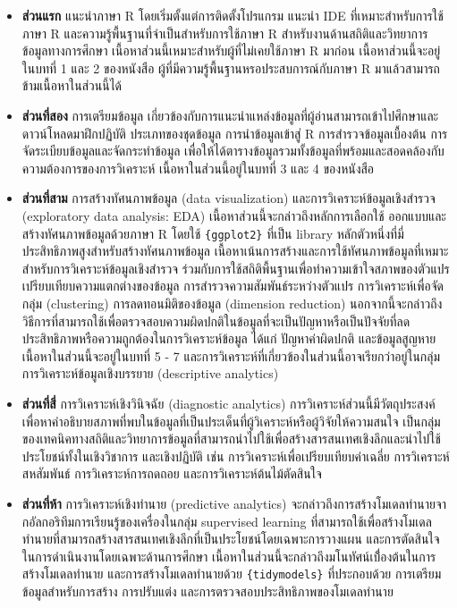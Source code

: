 \documentclass[
  a4paper,
]{book}
\begin{document}
\begin{itemize}
\item
  \textbf{ส่วนแรก} แนะนำภาษา R โดยเริ่มตั้งแต่การติดตั้งโปรแกรม แนะนำ IDE
  ที่เหมาะสำหรับการใช้ภาษา R และความรู้พื้นฐานที่จำเป็นสำหรับการใช้ภาษา R
  สำหรับงานด้านสถิติและวิทยาการข้อมูลทางการศึกษา
  เนื้อหาส่วนนี้เหมาะสำหรับผู้ที่ไม่เคยใช้ภาษา R มาก่อน เนื้อหาส่วนนี้จะอยู่ในบทที่ 1 และ 2
  ของหนังสือ ผู้ที่มีความรู้พื้นฐานหรอประสบการณ์กับภาษา R มาแล้วสามารถข้ามเนื้อหาในส่วนนี้ได้
\item
  \textbf{ส่วนที่สอง} การเตรียมข้อมูล
  เกี่ยวข้องกับการแนะนำแหล่งข้อมูลที่ผู้อ่านสามารถเข้าไปศึกษาและดาวน์โหลดมาฝึกปฏิบัติ
  ประเภทของชุดข้อมูล การนำข้อมูลเข้าสู่ R การสำรวจข้อมูลเบื้องต้น
  การจัดระเบียบข้อมูลและจัดกระทำข้อมูล
  เพื่อให้ได้ตารางข้อมูลรวมทั้งข้อมูลที่พร้อมและสอดคล้องกับความต้องการของการวิเคราะห์
  เนื้อหาในส่วนนี้อยู่ในบทที่ 3 และ 4 ของหนังสือ
\item
  \textbf{ส่วนที่สาม} การสร้างทัศนภาพข้อมูล (data visualization)
  และการวิเคราะห์ข้อมูลเชิงสำรวจ (exploratory data analysis: EDA)
  เนื้อหาส่วนนี้จะกล่าวถึงหลักการเลือกใช้ ออกแบบและสร้างทัศนภาพข้อมูลด้วยภาษา R โดยใช้
  \texttt{\{ggplot2\}} ที่เป็น library
  หลักตัวหนึ่งที่มี่ประสิทธิภาพสูงสำหรับสร้างทัศนภาพข้อมูล
  เนื้อหาเน้นการสร้างและการใช้ทัศนภาพข้อมูลที่เหมาะสำหรับการวิเคราะห์ข้อมูลเชิงสำรวจ
  ร่วมกับการใช้สถิติพื้นฐานเพื่อทำความเข้าใจสภาพของตัวแปร
  เปรียบเทียบความแตกต่างของข้อมูล การสำรวจความสัมพันธ์ระหว่างตัวแปร
  การวิเคราะห์เพื่อจัดกลุ่ม (clustering) การลดทอนมิติของข้อมูล (dimension
  reduction)
  นอกจากนี้จะกล่าวถึงวิธีการที่สามารถใช้เพื่อตรวจสอบความผิดปกติในข้อมูลที่จะเป็นปัญหาหรือเป็นปัจจัยที่ลดประสิทธิภาพหรือความถูกต้องในการวิเคราะห์ข้อมูล
  ได้แก่ ปัญหาค่าผิดปกติ และข้อมูลสูญหาย เนื้อหาในส่วนนี้จะอยู่ในบทที่ 5 - 7
  และการวิเคราะห์ที่เกี่ยวข้องในส่วนนี้อาจเรียกว่าอยู่ในกลุ่ม การวิเคราะห์ข้อมูลเชิงบรรยาย
  (descriptive analytics)
\item
  \textbf{ส่วนที่สี่} การวิเคราะห์เชิงวินิจฉัย (diagnostic analytics)
  การวิเคราะห์ส่วนนี้มีวัตถุประสงค์เพื่อหาคำอธิบายสภาพที่พบในข้อมูลที่เป็นประเด็นที่ผู้วิเคราะห์หรือผู้วิจัยให้ความสนใจ
  เป็นกลุ่มของเทคนิคทางสถิติและวิทยาการข้อมูลที่สามารถนำไปใช้เพื่อสร้างสารสนเทศเชิงลึกและนำไปใช้ประโยชน์ทั้งในเชิงวิชาการ
  และเชิงปฏิบัติ เช่น การวิเคราะห์เพื่อเปรียบเทียบค่าเฉลี่ย การวิเคราะห์สหสัมพันธ์
  การวิเคราะห์การถดถอย และการวิเคราะห์ต้นไม้ตัดสินใจ
\item
  \textbf{ส่วนที่ห้า} การวิเคราะห์เชิงทำนาย (predictive analytics)
  จะกล่าวถึงการสร้างโมเดลทำนายจากอัลกอริทึมการเรียนรู้ของเครื่องในกลุ่ม supervised
  learning
  ที่สามารถใช้เพื่อสร้างโมเดลทำนายที่สามารถสร้างสารสนเทศเชิงลึกที่เป็นประโยชน์โดยเฉพาะการวางแผน
  และการตัดสินใจในการดำเนินงานโดยเฉพาะด้านการศึกษา
  เนื้อหาในส่วนนี้จะกล่าวถึงมโนทัศน์เบื่้องต้นในการสร้างโมเดลทำนาย
  และการสร้างโมเดลทำนายด้วย \texttt{\{tidymodels\}} ที่ประกอบด้วย
  การเตรียมข้อมูลสำหรับการสร้าง การปรับแต่ง และการตรวจสอบประสิทธิภาพของโมเดลทำนาย
\end{itemize}
\end{document}
